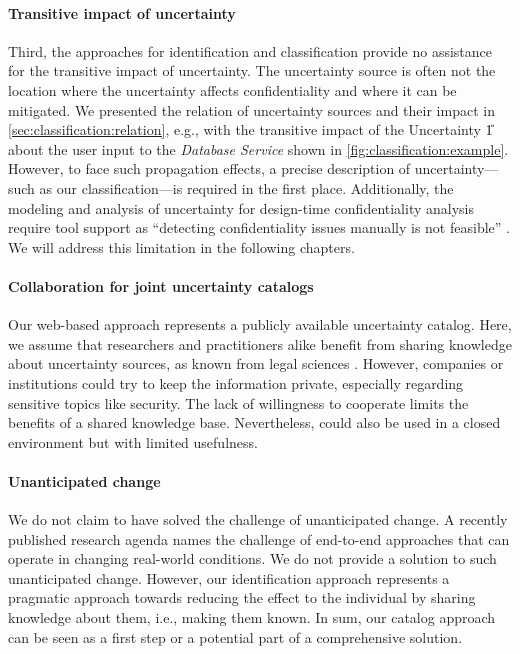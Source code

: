 \paragraph{Transitive impact of uncertainty}
Third, the approaches for identification and classification provide no assistance for the transitive impact of uncertainty.
The uncertainty source is often not the location where the uncertainty affects confidentiality and where it can be mitigated.
We presented the relation of uncertainty sources and their impact in \autoref{sec:classification:relation}, e.g., with the transitive impact of the Uncertainty \U{1} about the user input to the \emph{Database Service} shown in \autoref{fig:classification:example}.
However, to face such propagation effects, a precise description of uncertainty---such as our classification---is required in the first place.
Additionally, the modeling and analysis of uncertainty for design-time confidentiality analysis require tool support as \enquote{detecting confidentiality issues manually is not feasible} \cite{seifermann_data-driven_2019}.
We will address this limitation in the following chapters.

\paragraph{Collaboration for joint uncertainty catalogs}
Our web-based approach \arcen represents a publicly available uncertainty catalog.
Here, we assume that researchers and practitioners alike benefit from sharing knowledge about uncertainty sources, as known from legal sciences \cite{sterz_intelligente_2022}. 
However, companies or institutions could try to keep the information private, especially regarding sensitive topics like security.
The lack of willingness to cooperate limits the benefits of a shared knowledge base.
Nevertheless, \arcen could also be used in a closed environment but with limited usefulness.

\paragraph{Unanticipated change}
We do not claim to have solved the challenge of unanticipated change.
A recently published research agenda \cite{weyns_towards_2023} names the challenge of end-to-end approaches that can operate in changing real-world conditions.
We do not provide a solution to such unanticipated change.
However, our identification approach represents a pragmatic approach towards reducing the effect to the individual by sharing knowledge about them, i.e., making them known.
In sum, our catalog approach can be seen as a first step or a potential part of a comprehensive solution.





